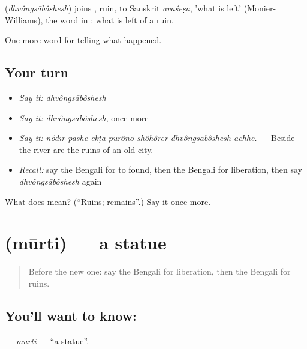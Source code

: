 \begin{cousinweb}
\textbf{} (\emph{dhvôngsābôshesh}) joins \textbf{}, ruin, to Sanskrit \emph{avaśeṣa}, 'what is left' (Monier-Williams), the word in \textbf{}: what is left of a ruin.
\end{cousinweb}

\begin{grammarlens}[title={What you've built}]
One more word for telling what happened.
\end{grammarlens}

\subsection*{Your turn}
\begin{itemize}
\raggedright
  \item \emph{Say it:} \emph{dhvôngsābôshesh}
  \item \emph{Say it:} \emph{dhvôngsābôshesh}, once more
  \item \emph{Say it:} \emph{nôdīr pāshe ekṭā purôno shôhôrer dhvôngsābôshesh āchhe.} — Beside the river are the ruins of an old city.
  \item \emph{Recall:} say the Bengali for to found, then the Bengali for liberation, then say \emph{dhvôngsābôshesh} again
\end{itemize}

\begin{tcolorbox}[breakable,colback=teal!4,colframe=teal!35!black,title={Before you move on}]
What does  mean? (\textquotedblleft{}Ruins; remains\textquotedblright{}.) Say it once more.
\end{tcolorbox}
\section[\texorpdfstring{\bn{মূর্তি} (mūrti)}{মূর্তি (mūrti)}]{ (mūrti) — a statue}

\label{lesson:BN-C319-murti}



\begin{quote}
Before the new one: say the Bengali for liberation, then the Bengali for ruins.
\end{quote}

\subsection*{You'll want to know: }
\textbf{} — \emph{mūrti} — \textquotedblleft{}a statue\textquotedblright{}.


